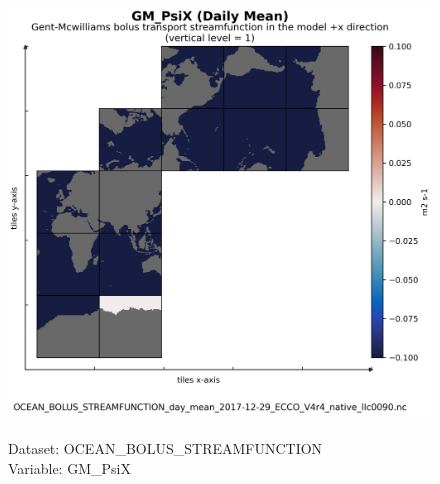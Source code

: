 \begin{figure}[H]
\centering
\includegraphics[scale=0.5]{../images/plots/native_plots/Gent-McWilliams_Bolus_Transport_Streamfunction/GM_PsiX.png}
\caption{\\Dataset: OCEAN\_BOLUS\_STREAMFUNCTION\\Variable: GM\_PsiX}
\label{tab:table-OCEAN_BOLUS_STREAMFUNCTION_GM_PsiX-Plot}
\end{figure}
\pagebreak
